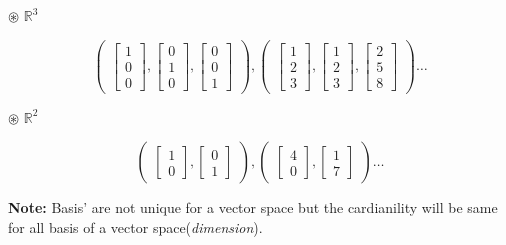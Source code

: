 \documentclass[a4paper,11pt]{article}
\numberwithin{equation}{section}
\begin{document}
\begin{itemize}
\textbf{$\circledast$ } $\mathbb{R}^3$
\begin{center}
    \[
        \begin{pmatrix}
            \begin{bmatrix}1\\0\\0\end{bmatrix},
            \begin{bmatrix}0\\1\\0\end{bmatrix},
            \begin{bmatrix}0\\0\\1\end{bmatrix}
        \end{pmatrix},
        \begin{pmatrix}
            \begin{bmatrix}1\\2\\3\end{bmatrix},
            \begin{bmatrix}1\\2\\3\end{bmatrix},
            \begin{bmatrix}2\\5\\8\end{bmatrix}
        \end{pmatrix}\dots
    \]
\end{center}
\textbf{$\circledast$ } $\mathbb{R}^2$
\begin{center}
    \[
        \begin{pmatrix}
            \begin{bmatrix}1\\0\end{bmatrix},
            \begin{bmatrix}0\\1\end{bmatrix}
        \end{pmatrix},
        \begin{pmatrix}
            \begin{bmatrix}4\\0\end{bmatrix},
            \begin{bmatrix}1\\7\end{bmatrix}
        \end{pmatrix}\dots
    \]
\end{center}
\textbf{Note: }Basis' are not unique for a vector space but the cardianility will be same for all basis of a vector space(\textit{dimension}).


\end{itemize}
\end{document}
